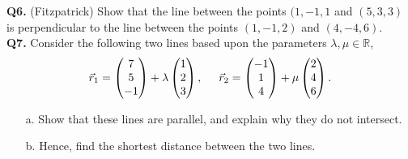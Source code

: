 \documentclass{article}
\begin{document}
\textbf{Q6.} (Fitzpatrick) Show that the line between the points $(1, -1, 1$ and $(5,3,3)$ is perpendicular to the line between the points $(1, -1, 2)$ and $(4, -4, 6).$ \\

\textbf{Q7.} Consider the following two lines based upon the parameters $\lambda, \mu \in \mathbb{R}$,
$$
\vec{r}_1 = 
\begin{pmatrix}
    7 \\
    5 \\
    -1
\end{pmatrix} + \lambda
\begin{pmatrix}
    1 \\
    2 \\ 
    3
\end{pmatrix}, \hspace{0.5cm}
\vec{r}_2 =
\begin{pmatrix}
    -1 \\
    1 \\
    4
\end{pmatrix} + \mu
\begin{pmatrix}
    2 \\
    4 \\
    6
\end{pmatrix}.
$$
\begin{enumerate}
    \item[a.] Show that these lines are parallel, and explain why they do not intersect.
    \item[b.] Hence, find the shortest distance between the two lines.
\end{enumerate}
\end{document}
